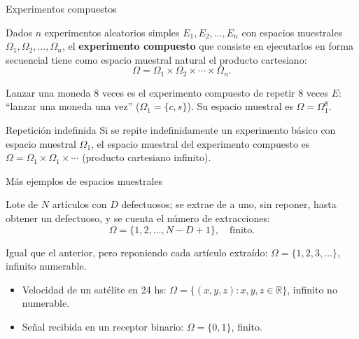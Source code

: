\documentclass[aspectratio=169,11pt]{beamer}
\begin{document}
\begin{frame}{Experimentos compuestos}
\begin{definition}
Dados $n$ experimentos aleatorios simples $E_1, E_2, \dots, E_n$ con espacios muestrales $\Omega_1, \Omega_2, \dots, \Omega_n$, el \textbf{experimento compuesto} que consiste en ejecutarlos en forma secuencial tiene como espacio muestral natural el producto cartesiano:
\[
\Omega = \Omega_1 \times \Omega_2 \times \cdots \times \Omega_n.
\]
\end{definition}

\begin{example}
Lanzar una moneda 8 veces es el experimento compuesto de repetir 8 veces $E$: ``lanzar una moneda una vez'' ($\Omega_1=\{c,s\}$). Su espacio muestral es $\Omega = \Omega_1^{8}$.
\end{example}

\begin{block}{Repetición indefinida}
Si se repite indefinidamente un experimento básico con espacio muestral $\Omega_1$, el espacio muestral del experimento compuesto es $\Omega = \Omega_1 \times \Omega_1 \times \cdots$ (producto cartesiano infinito).
\end{block}
\end{frame}

\begin{frame}{Más ejemplos de espacios muestrales}
\begin{example}
Lote de $N$ artículos con $D$ defectuosos; se extrae de a uno, sin reponer, hasta obtener un defectuoso, y se cuenta el número de extracciones:
\[
\Omega = \{1,2,\dots,N-D+1\}, \quad \text{finito.}
\]
\end{example}

\begin{example}
Igual que el anterior, pero reponiendo cada artículo extraído:
$\Omega = \{1,2,3,\dots\}$, infinito numerable.
\end{example}

\begin{example}
\begin{itemize}
\item Velocidad de un satélite en 24 hs: $\Omega = \{(x,y,z) : x,y,z \in \mathbb{R}\}$, infinito no numerable.
\item Señal recibida en un receptor binario: $\Omega = \{0,1\}$, finito.
\end{itemize}
\end{example}
\end{frame}
\end{document}
